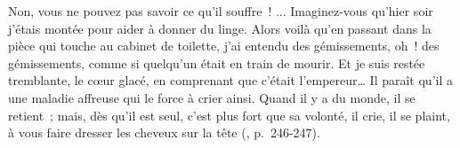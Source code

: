\documentclass[11pt,twoside,openany]{book}
\newenvironment{lateiDocument}{}{}
\begin{document}
\begin{lateiDocument}
\begin{teiElement}[name={TEI},change={commons\_edition}]
\begin{teiElement}[name={text},type={book},xmlid={book}]
\begin{teiElement}[name={group},type={book},xmlid={book-001}]
\begin{teiElement}[name={group},type={section1},xmlid={section1-001}]
\begin{teiElement}
\begin{teiElement}[name={body},xmlid={body-005}]
\begin{teiDiv}[type={section1},xmlid={div03-3}]
              \begin{teiCit}[xmlid={cit12}]

                \begin{teiQuote}
Non, vous ne pouvez pas savoir ce qu’il souffre ! ... Imaginez-vous qu’hier soir j’étais montée pour aider à donner du linge. Alors voilà qu’en passant dans la pièce qui touche au cabinet de toilette, j’ai entendu des gémissements, oh ! des gémissements, comme si quelqu’un était en train de mourir. Et je suis restée tremblante, le cœur glacé, en comprenant que c’était l’empereur… Il paraît qu’il a une maladie affreuse qui le force à crier ainsi. Quand il y a du monde, il se retient ; mais, dès qu’il est seul, c’est plus fort que sa volonté, il crie, il se plaint, à vous faire dresser les cheveux sur la tête (, p. 246-247).
\end{teiQuote}
              

\end{teiCit}
\end{teiDiv}
\end{teiElement}
\end{teiElement}
\end{teiElement}
\end{teiElement}
\end{teiElement}
\end{teiElement}
\end{lateiDocument}
\end{document}
